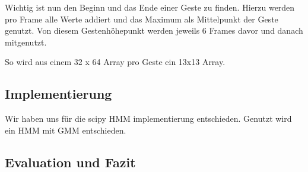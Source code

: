 Wichtig ist nun den Beginn und das Ende einer Geste zu finden. Hierzu werden pro Frame alle Werte addiert 
und das Maximum als Mittelpunkt der Geste genutzt. Von diesem Gestenhöhepunkt werden jeweils 6 Frames davor und danach mitgenutzt.

So wird aus einem 32 x 64 Array pro Geste ein 13x13 Array.


\subsection{Implementierung}
Wir haben uns für die scipy HMM implementierung entschieden. 
Genutzt wird ein \acl{HMM} mit \acl{GMM} entschieden.


\subsection{Evaluation und Fazit}
